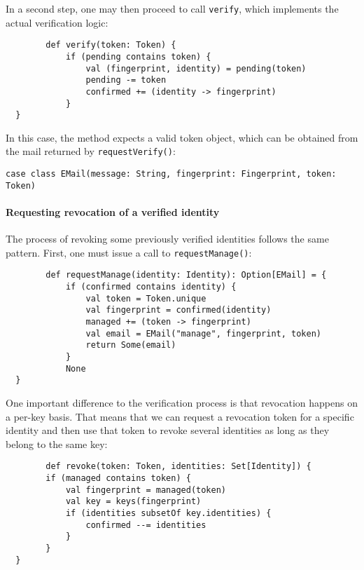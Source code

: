 In a second step, one may then proceed to call \texttt{verify}, which implements the actual verification logic: 
\begin{code}
    \begin{verbatim}
        def verify(token: Token) {
            if (pending contains token) {
                val (fingerprint, identity) = pending(token)
                pending -= token
                confirmed += (identity -> fingerprint)
            }
  }
    \end{verbatim}
\end{code}
In this case, the method expects a valid token object, which can be obtained from the mail returned by \texttt{requestVerify()}: 
\begin{code}
\begin{verbatim}
case class EMail(message: String, fingerprint: Fingerprint, token: Token)
\end{verbatim}
\end{code}

\paragraph{Requesting revocation of a verified identity} The process of revoking some previously verified identities follows the same pattern. First, one must issue a call to \texttt{requestManage()}: 
\begin{code}
    \begin{verbatim}
        def requestManage(identity: Identity): Option[EMail] = {
            if (confirmed contains identity) {
                val token = Token.unique
                val fingerprint = confirmed(identity)
                managed += (token -> fingerprint)
                val email = EMail("manage", fingerprint, token)
                return Some(email)
            }
            None
  }
    \end{verbatim}
\end{code}
One important difference to the verification process is that revocation happens on a per-key basis. That means that we can request a revocation token for a specific identity and then use that token to revoke several identities as long as they belong to the same key: 
\begin{code}
    \begin{verbatim}
        def revoke(token: Token, identities: Set[Identity]) {
        if (managed contains token) {
            val fingerprint = managed(token)
            val key = keys(fingerprint)
            if (identities subsetOf key.identities) {
                confirmed --= identities
            }
        }
  }
    \end{verbatim}
\end{code}

